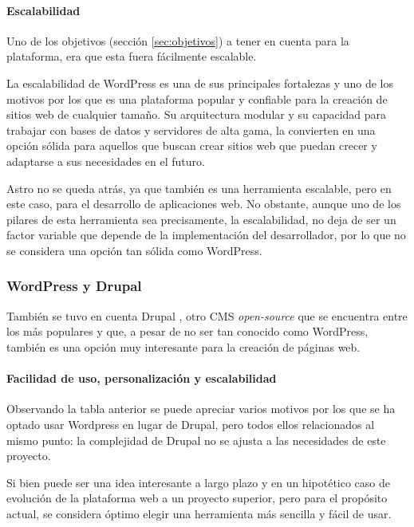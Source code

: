                 \paragraph{Escalabilidad}
                
                    Uno de los objetivos (sección \ref{sec:objetivos}) a tener en cuenta para la plataforma, era que esta fuera fácilmente escalable.

                    La escalabilidad de WordPress es una de sus principales fortalezas y uno de los motivos por los que es una plataforma popular y confiable para la creación de sitios web de cualquier tamaño. Su arquitectura modular y su capacidad para trabajar con bases de datos y servidores de alta gama, la convierten en una opción sólida para aquellos que buscan crear sitios web que puedan crecer y adaptarse a sus necesidades en el futuro.

                    Astro no se queda atrás, ya que también es una herramienta escalable, pero en este caso, para el desarrollo de aplicaciones web. No obstante, aunque uno de los pilares de esta herramienta sea precisamente, la escalabilidad, no deja de ser un factor variable que depende de la implementación del desarrollador, por lo que no se considera una opción tan sólida como WordPress.

            \subsubsection{WordPress y Drupal}

                También se tuvo en cuenta Drupal \cite{drupal}, otro CMS \textit{open-source} que se encuentra entre los más populares y que, a pesar de no ser tan conocido como WordPress, también es una opción muy interesante para la creación de páginas web.

                \paragraph{Facilidad de uso, personalización y escalabilidad}
                
                    Observando la tabla anterior se puede apreciar varios motivos por los que se ha optado usar Wordpress en lugar de Drupal, pero todos ellos relacionados al mismo punto: la complejidad de Drupal no se ajusta a las necesidades de este proyecto.
    
                    Si bien puede ser una idea interesante a largo plazo y en un hipotético caso de evolución de la plataforma web a un proyecto superior, pero para el propósito actual, se considera óptimo elegir una herramienta más sencilla y fácil de usar.
    
